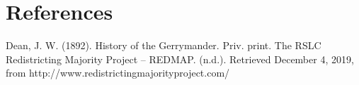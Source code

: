 \documentclass{article}
\begin{document}
\section{References}
Dean, J. W. (1892). History of the Gerrymander. Priv. print.
The RSLC Redistricting Majority Project – REDMAP. (n.d.). Retrieved December 4, 2019, from http://www.redistrictingmajorityproject.com/
\end{document}
